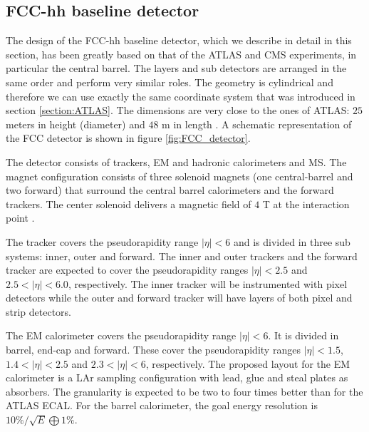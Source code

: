 \subsection{FCC-hh baseline detector}
\label{section:FCC_detector}

The design of the FCC-hh baseline detector, which we describe in detail in this section, has been greatly based on that of the ATLAS and CMS experiments, in particular the central barrel. The layers and sub detectors are arranged in the same order and perform very similar roles. The geometry is cylindrical and therefore we can use exactly the same coordinate system that was introduced in section \ref{section:ATLAS}. The dimensions are very close to the ones of ATLAS: $25$ meters in height (diameter) and $48$ m in length \cite{FCCgen}. A schematic representation of the FCC detector is shown in figure \ref{fig:FCC_detector}.

The detector consists of trackers, EM and hadronic calorimeters and MS. The magnet configuration consists of three solenoid magnets (one central-barrel and two forward) that surround the central barrel calorimeters and the forward trackers. The center solenoid delivers a magnetic field of $4$ T at the interaction point \cite{FCCmag}.

The tracker covers the pseudorapidity range $|\eta|<6$ and is divided in three sub systems: inner, outer and forward. The inner and outer trackers and the forward tracker are expected to cover the pseudorapidity ranges $|\eta|<2.5$ and $2.5<|\eta|<6.0$, respectively. The inner tracker will be instrumented with pixel detectors while the outer and forward tracker will have layers of both pixel and strip detectors. 

The EM calorimeter \cite{FCC_ECAL,FCC_ECAL1} covers the pseudorapidity range $|\eta|<6$. It is divided in barrel, end-cap and forward. These cover the pseudorapidity ranges $|\eta|<1.5$, $1.4<|\eta|<2.5$ and $2.3<|\eta|<6$, respectively. The proposed layout for the EM calorimeter is a LAr sampling configuration with lead, glue and steal plates as absorbers. The granularity is expected to be two to four times better than for the ATLAS ECAL. For the barrel calorimeter, the goal energy resolution is $10\%/\sqrt{E}\bigoplus 1\%$.

